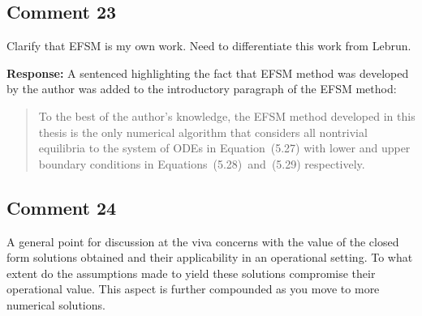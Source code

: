 \documentclass[10pt,a4paper,notitlepage]{article}
\numberwithin{equation}{section}
\begin{document}
\subsection{Comment 23}
Clarify that EFSM is my own work. Need to differentiate this work from Lebrun.

\textbf{Response:}
A sentenced highlighting the fact that EFSM method was developed by the author was added to the introductory paragraph of the EFSM method:
\begin{quote}
To the best of the author's knowledge, the EFSM method developed in this thesis is the only numerical algorithm that considers all nontrivial equilibria to the system of ODEs in Equation~(5.27) with lower and upper boundary conditions in Equations~(5.28)~and~(5.29) respectively.
\end{quote}

\subsection{Comment 24}
A general point for discussion at the viva concerns with the value of the closed form solutions obtained and their applicability in an operational setting. To what extent do the assumptions made to yield these solutions compromise their operational value. This aspect is further compounded as you move to more numerical solutions.
\end{document}
